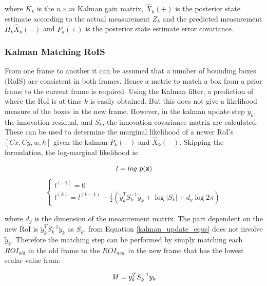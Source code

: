 \documentclass[11pt,twoside]{report}
\begin{document}
where $K_{k}$ is the $n \times m$ Kalman gain matrix, $\hat{X}_{k}(+)$ is the posterior state estimate according to the actual measurement $Z_{k}$ and the predicted measurement $H_{k} \hat{X}_{k}(-)$ and $P_{k}(+)$ is the posterior state estimate error covariance.

\subsubsection{Kalman Matching RoIS}

From one frame to another it can be assumed that a number of bounding boxes (RoIS) are consistent in both frames. Hence a metric to match a box from a prior frame to the current frame is required. Using the Kalman filter, a prediction of where the RoI is at time $k$ is easily obtained. But this does not give a likelihood measure of the boxes in the new frame. However, in the kalman update step $\tilde{y}_{k}$, the innovation residual, and $S_{k}$, the innovation covariance matrix are calculated. These can be used to determine the marginal likelihood of a newer RoI's $[Cx,Cy,w,h]$ given the kalman $P_{k}(-)$ and $\hat{X}_{k}(-)$. Skipping the formulation, the log-marginal likelihood is:

\begin{equation}
l = log \textnormal{ } p(\mathbf{z})
\end{equation}
\begin{equation}
\begin{cases}
l^{(-1)} = 0 \\
l^{(k)} = l^{(k-1)} - \frac{1}{2} (\tilde{y}_{k}^{T}S_{k}^{-1}\tilde{y}_{k} + \log |S_{k}| + d_{y}\log 2 \pi) 
\end{cases}
\end{equation}

where $d_{y}$ is the dimension of the measurement matrix. The part dependent on the new RoI is $\tilde{y}_{k}^{T}S_{k}^{-1}\tilde{y}_{k}$ as $S_{k}$, from Equation \ref{kalman_update_equs} does not involve $\tilde{y}_{k}$. Therefore the matching step can be performed by simply matching each $ROI_{old}$ in the old frame to the $ROI_{new}$ in the new frame that has the lowest scalar value from:

\begin{equation}
\begin{aligned}
\textnormal{\textit{M}} = \tilde{y}_{k}^{T}S_{k}^{-1}\tilde{y}_{k}
\end{aligned}
\end{equation}
\end{document}
